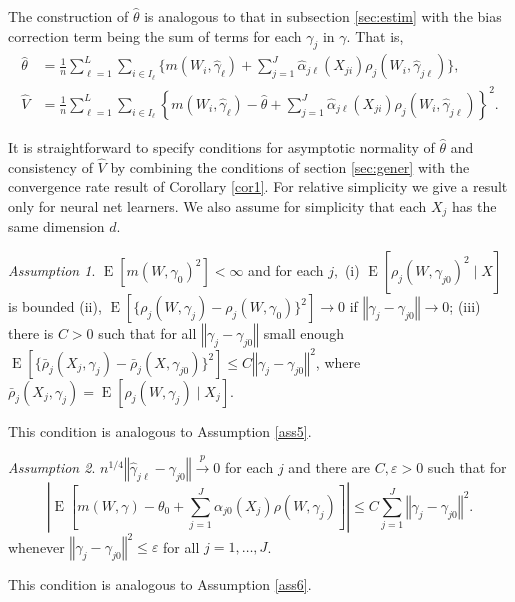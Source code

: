 \documentclass[aos]{imsart}
\numberwithin{equation}{section}
\theoremstyle{plain}
\theoremstyle{remark}
\newtheorem{assumption}{Assumption}
\DeclareMathOperator{\E}{E}
\begin{document}
The construction of $\hat{\theta}$ is analogous to that in subsection \ref{sec:estim} with the bias correction term being the sum of terms for each $\gamma_{j}$ in $\gamma.$ That is,
\begin{align}
\hat{\theta}  &  = \frac{1}{n}\sum_{\ell=1}^{L}\sum_{i\in I_{\ell}}%
\{m(W_{i},\hat{\gamma}_{\ell})+\sum_{j=1}^{J}\hat{\alpha}_{j\ell}(X_{ji}%
)\rho_{j}(W_{i},\hat{\gamma}_{j\ell})\},\label{nonlin est}\\
\hat{V}  &  =\frac{1}{n}\sum_{\ell=1}^{L}\sum_{i\in I_{\ell}} \left\lbrace m(W_{i},\hat{\gamma}_{\ell}%
)-\hat{\theta}+\sum_{j=1}^{J}\hat{\alpha}_{j\ell}(X_{ji})\rho_{j}(W_{i}%
,\hat{\gamma}_{j\ell}) \right\rbrace^2.\nonumber
\end{align}

It is straightforward to specify conditions for asymptotic normality of $\hat{\theta}$ and consistency of $\hat{V}$ by combining the conditions of section \ref{sec:gener} with the convergence rate result of Corollary \ref{cor1}. For relative simplicity we give a result only for neural net learners. We also assume for simplicity that each $X_{j}$ has the same dimension $d.$

\begin{assumption}\label{ass7}
$\E[m(W,\gamma_{0})^{2}]<\infty$ and for each
$j,$ (i) $\E[\rho_{j}(W,\gamma_{j0})^{2}\mid X]$ is bounded (ii),
$\E[\{\rho_{j}(W,\gamma_{j})-\rho_{j}(W,\gamma_{0})\}^{2}]\to0$
if $\left\Vert \gamma_{j}-\gamma_{j0}\right\Vert \to0$;
(iii) there is $C>0$ such that for all $\left\Vert \gamma
_{j}-\gamma_{j0}\right\Vert $ small enough $\E[\{\bar{\rho}_{j}%
(X_{j},\gamma_{j})-\bar{\rho}_{j}(X,\gamma_{j0})\}^{2}]\leq C\left\Vert\gamma_{j}-\gamma_{j0}\right\Vert ^{2}$, where $\bar{\rho}_{j}(X_{j},\gamma_{j})=\E[\rho_{j}(W,\gamma_{j})\mid X_{j}].$    
\end{assumption}
This condition is analogous to Assumption \ref{ass5}. 

\begin{assumption}\label{ass8}
$n^{1/4}\left\Vert \hat{\gamma}_{j\ell}-\gamma_{j0}\right\Vert \overset{p}{\to}0$  for each $j$ and there are $C,\varepsilon>0$ such that for
\[
\left\vert \E[m(W,\gamma)-\theta_{0}+\sum_{j=1}^{J}\alpha_{j0}(X_{j})\rho(W,\gamma_{j})]\right\vert \leq C\sum_{j=1}^{J}\left\Vert \gamma_{j}-\gamma_{j0}\right\Vert ^{2}.
\]
whenever $\left\Vert \gamma_{j}-\gamma_{j0}\right\Vert ^{2} \leq \varepsilon$ for all $j = 1, \ldots, J$.
\end{assumption}
This condition is analogous to Assumption \ref{ass6}.
\end{document}
